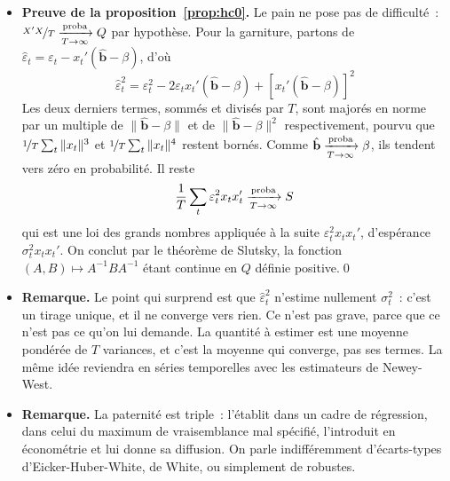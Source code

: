 \documentclass[10pt]{beamer}
\begin{document}
\begin{notes}

  \begin{itemize}

  \item \textbf{Preuve de la proposition~\ref{prop:hc0}.} Le pain ne pose pas de
    difficulté~: $\nicefrac{X'X}{T}\xrightarrow[T\rightarrow\infty]{\text{proba}} Q$ par hypothèse. Pour la garniture,
    partons de $\hat\varepsilon_t = \varepsilon_t - x_t'(\hat{\mathbf b}-\beta)$,
    d'où
    \[
      \hat\varepsilon_t^2 = \varepsilon_t^2
      - 2\varepsilon_t x_t'(\hat{\mathbf b}-\beta)
      + \left[x_t'(\hat{\mathbf b}-\beta)\right]^2
    \]
    Les deux derniers termes, sommés et divisés par $T$, sont majorés en norme
    par un multiple de $\|\hat{\mathbf b}-\beta\|$ et de
    $\|\hat{\mathbf b}-\beta\|^2$ respectivement, pourvu que
    $\nicefrac{1}{T}\sum_t\|x_t\|^3$ et $\nicefrac{1}{T}\sum_t\|x_t\|^4$ restent
    bornés. Comme $\hat{\mathbf b}\xrightarrow[T\rightarrow\infty]{\text{proba}}\beta$, ils tendent vers zéro en
    probabilité. Il reste
    \[
      \frac{1}{T}\sum_t \varepsilon_t^2x_tx_t' \xrightarrow[T\rightarrow\infty]{\text{proba}} S
    \]
    qui est une loi des grands nombres appliquée à la suite
    $\varepsilon_t^2x_tx_t'$, d'espérance $\sigma_t^2x_tx_t'$. On conclut par le
    théorème de Slutsky, la fonction $(A,B)\mapsto A^{-1}BA^{-1}$ étant continue
    en $Q$ définie positive.\qed\newline

  \item \textbf{Remarque.} Le point qui surprend est que
    $\hat\varepsilon_t^2$ n'estime nullement $\sigma_t^2$~: c'est un tirage
    unique, et il ne converge vers rien. Ce n'est pas grave, parce que ce n'est
    pas ce qu'on lui demande. La quantité à estimer est une moyenne pondérée de
    $T$ variances, et c'est la moyenne qui converge, pas ses termes. La même
    idée reviendra en séries temporelles avec les estimateurs de
    Newey-West.\newline

  \item \textbf{Remarque.} La paternité est triple~: \cite{Eicker1967} l'établit
    dans un cadre de régression, \cite{Huber1967} dans celui du maximum de
    vraisemblance mal spécifié, \cite{White1980} l'introduit en économétrie et
    lui donne sa diffusion. On parle indifféremment d'écarts-types d'Eicker-Huber-White,
    de White, ou simplement de robustes.

  \end{itemize}

\end{notes}
\end{document}
